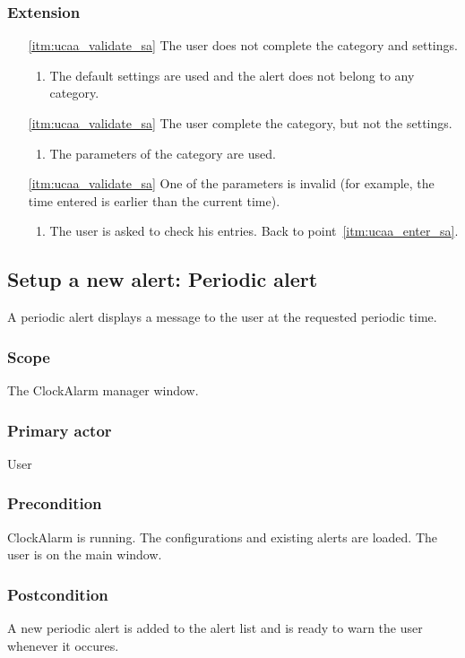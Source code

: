 \subsubsection{Extension}
\begin{enumerate}
	\item[\ref{itm:ucaa_validate_sa}] The user does not complete the category and settings.
	\begin{enumerate}[i]
		\item The default settings are used and the alert does not belong to any category.
	\end{enumerate}
	\item[\ref{itm:ucaa_validate_sa}] The user complete the category, but not the settings.
	\begin{enumerate}[i]
		\item The parameters of the category are used.
	\end{enumerate}
	\item[\ref{itm:ucaa_validate_sa}] One of the parameters is invalid (for example, the time entered is earlier than the current time).
	\begin{enumerate}[i]
		\item The user is asked to check his entries. Back to point~\ref{itm:ucaa_enter_sa}.
	\end{enumerate}
\end{enumerate}

\subsection{Setup a new alert: Periodic alert}
A periodic alert displays a message to the user at the requested periodic time.
\subsubsection{Scope}
The ClockAlarm manager window.
\subsubsection{Primary actor}
User
\subsubsection{Precondition}
ClockAlarm is running. The configurations and existing alerts are loaded. The user is on the main window.
\subsubsection{Postcondition}
A new periodic alert is added to the alert list and is ready to warn the user whenever it occures.
